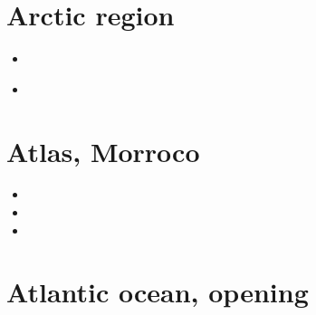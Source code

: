 \section{Arctic region}

\begin{small}
\begin{itemize}
\item[\twothousandtwentyone] 
\item[\twothousandtwentyfour] 
\\
\end{itemize}
\end{small}

\section{Atlas, Morroco}

\begin{small}
\begin{itemize}
\item[\twothousandtwelve]
\item[\twothousandfourteen]
\item[\twothousandtwentythree]
\end{itemize}
\end{small}

\section{Atlantic ocean, opening}

